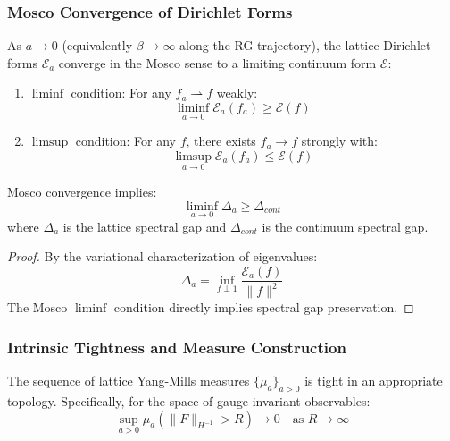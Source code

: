\subsubsection{Mosco Convergence of Dirichlet Forms}

\begin{theorem}
\label{thm:mosco}
As $a \to 0$ (equivalently $\beta \to \infty$ along the RG trajectory), the lattice Dirichlet forms $\mathcal{E}_a$ converge in the Mosco sense to a limiting continuum form $\mathcal{E}$:
\begin{enumerate}
\item[(M1)] $\liminf$ condition: For any $f_a \rightharpoonup f$ weakly:
\begin{equation}
\liminf_{a \to 0} \mathcal{E}_a(f_a) \geq \mathcal{E}(f)
\end{equation}

\item[(M2)] $\limsup$ condition: For any $f$, there exists $f_a \to f$ strongly with:
\begin{equation}
\limsup_{a \to 0} \mathcal{E}_a(f_a) \leq \mathcal{E}(f)
\end{equation}
\end{enumerate}
\end{theorem}

\begin{theorem}
\label{thm:gap_preservation}
Mosco convergence implies:
\begin{equation}
\liminf_{a \to 0} \Delta_a \geq \Delta_{cont}
\end{equation}
where $\Delta_a$ is the lattice spectral gap and $\Delta_{cont}$ is the continuum spectral gap.
\end{theorem}

\begin{proof}
By the variational characterization of eigenvalues:
\begin{equation}
\Delta_a = \inf_{f \perp 1} \frac{\mathcal{E}_a(f)}{\|f\|^2}
\end{equation}
The Mosco $\liminf$ condition directly implies spectral gap preservation.
\end{proof}

\subsubsection{Intrinsic Tightness and Measure Construction}

\begin{theorem}
\label{thm:tightness}
The sequence of lattice Yang-Mills measures $\{\mu_a\}_{a > 0}$ is tight in an appropriate topology. Specifically, for the space of gauge-invariant observables:
\begin{equation}
\sup_{a > 0} \mu_a\left(\|F\|_{H^{-1}} > R\right) \to 0 \quad \text{as } R \to \infty
\end{equation}
\end{theorem}

